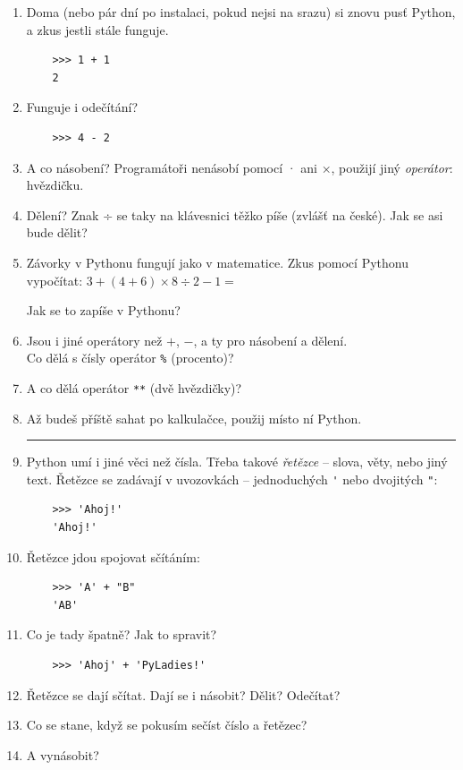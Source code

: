 \documentclass[a4paper,10pt]{article}
\newcommand\answerspace{\\\rule[0cm]{0pt}{1cm}}
\begin{document}
\begin{enumerate}
\item Doma (nebo pár dní po instalaci, pokud nejsi na srazu) si znovu pusť Python,
    a zkus jestli stále funguje.
    \begin{verbatim}
    >>> 1 + 1
    2
    \end{verbatim}
\item Funguje i odečítání?
    \begin{verbatim}
    >>> 4 - 2
    \end{verbatim}
\item A co násobení? Programátoři nenásobí pomocí · ani ×, použijí jiný \emph{operátor}: hvězdičku.
\item Dělení? Znak ÷ se taky na klávesnici těžko píše (zvlášť na české). Jak se asi bude dělit?
\item Závorky v Pythonu fungují jako v matematice.
    Zkus pomocí Pythonu vypočítat: $3 + (4 + 6) \times 8 \div 2 - 1 = $

    Jak se to zapíše v Pythonu?
    \answerspace
\item Jsou i jiné operátory než $+$, $-$, a ty pro násobení a dělení.
    \\Co dělá s čísly operátor \verb+%+ (procento)?
\item A co dělá operátor \verb+**+ (dvě hvězdičky)?
\item Až budeš příště sahat po kalkulačce, použij místo ní Python.

    \bigskip\bigskip\hrule\bigskip\bigskip

\item Python umí i jiné věci než čísla. Třeba takové \emph{řetězce} – slova, věty, nebo jiný text.
    Řetězce se zadávají v uvozovkách – jednoduchých \verb|'| nebo dvojitých \verb|"|:
    \begin{verbatim}
    >>> 'Ahoj!'
    'Ahoj!'
    \end{verbatim}
\item Řetězce jdou spojovat sčítáním:
    \begin{verbatim}
    >>> 'A' + "B"
    'AB'
    \end{verbatim}
\item Co je tady špatně? Jak to spravit?
    \begin{verbatim}
    >>> 'Ahoj' + 'PyLadies!'
    \end{verbatim}
\item Řetězce se dají sčítat. Dají se i násobit? Dělit? Odečítat?
    \answerspace
\item Co se stane, když se pokusím sečíst číslo a řetězec?
    \answerspace
\item A vynásobit?

\end{enumerate}
\end{document}
